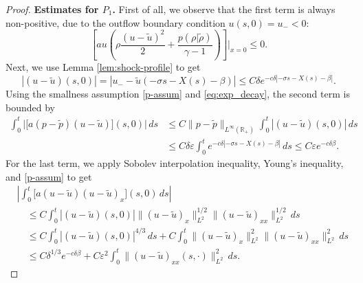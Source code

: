 \documentclass[11pt,reqno]{amsart}
\numberwithin{equation}{section} %
\begin{document}
\begin{proof}
\noindent \textbf{Estimates for $P_1$.} 
First of all, we observe that the first term is always non-positive, due to the outflow boundary condition $u(s,0)=u_-<0$:
\[\left[au\left(\rho\frac{(u-\tilde{u})^2}{2}+\frac{p(\rho|\tilde{\rho})}{\gamma-1}\right)\right]\bigg|_{x=0}\le 0.\]
Next, we use Lemma \ref{lem:shock-profile} to get
\[
    |(u-\tilde{u})(s,0)| = |u_- - \tilde{u}(-\sigma s -X(s)-\beta)| \le C \delta e^{-c\delta|-\sigma s - X(s) - \beta|}.
\]
Using the smallness assumption \eqref{p-assum} and \eqref{eq:exp_decay}, the second term is bounded by
\begin{align*}
    \int_0^t \bigl| \bigl[ a (p-\tilde{p}) (u-\tilde{u}) \bigr](s,0) \bigr| \, ds &\leq C\|p-\tilde{p}\|_{L^\infty(\mathbb{R}_+)}\int_0^t |(u-\tilde{u})(s,0)| \, ds\\
    &\leq C\delta \varepsilon \int_0^t e^{-c\delta|-\sigma s - X(s) - \beta|} \, ds \leq C\varepsilon e^{-c\delta\beta}.
\end{align*}
For the last term, we apply Sobolev interpolation inequality, Young's inequality, and \eqref{p-assum} to get
\begin{align*}
    &\left|\int_0^t \bigl[ a (u-\tilde{u}) (u-\tilde{u})_x \bigr] (s,0) \, ds\right| \\
    &\quad \leq C \int_0^t |(u-\tilde{u})(s,0)| \|(u-\tilde{u})_x\|_{L^2}^{1/2} \|(u-\tilde{u})_{xx}\|_{L^2}^{1/2} \, ds\\
    &\quad \leq C\int_0^t |(u-\tilde{u})(s,0)|^{4/3} \, ds + C\int_0^t \|(u-\tilde{u})_x\|_{L^2}^{2} \|(u-\tilde{u})_{xx}\|_{L^2}^{2} \, ds\\
    &\quad \leq C\delta^{1/3}e^{-c\delta\beta} + C\varepsilon^2\int_0^t \|(u-\tilde{u})_{xx}(s,\cdot)\|_{L^2}^2 \, ds.
\end{align*}


\end{proof}
\end{document}
